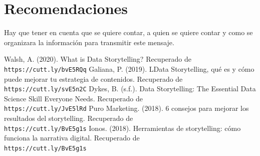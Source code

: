 \documentclass[twoside,twocolumn]{article}
\begin{document}
\section{Recomendaciones}
Hay que tener en cuenta que se quiere contar, a quien se quiere contar y como se organizara la información para transmitir este mensaje.


\begin{thebibliography}{99} 
    \bibitem{}
    Walsh, A. (2020). What is Data Storytelling? Recuperado de 
    \\\texttt{https://cutt.ly/bvE5RQq}
    \bibitem{}
    Galiana, P. (2019). LData Storytelling, qué es y cómo puede mejorar tu estrategia de contenidos. Recuperado de 
    \\\texttt{https://cutt.ly/svE5n2C}
    \bibitem{}
    Dykes, B. (s.f.). Data Storytelling: The Essential Data Science Skill Everyone Needs. Recuperado de 
    \\\texttt{https://cutt.ly/JvE5lRd}
    \bibitem{}
    Puro Marketing. (2018). 6 consejos para mejorar los resultados del storytelling. Recuperado de 
    \\\texttt{https://cutt.ly/BvE5g1s}
    \bibitem{}
    Ionos. (2018). Herramientas de storytelling: cómo funciona la narrativa digital. Recuperado de 
    \\\texttt{https://cutt.ly/BvE5g1s}
\end{thebibliography}
\end{document}
